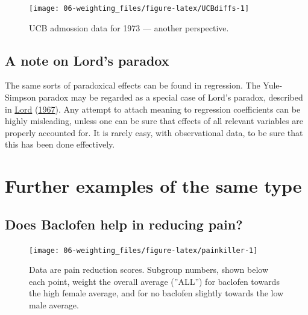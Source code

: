 \documentclass[
  10pt,
  b5paper]{book}
\begin{document}
\begin{figure}[H]

{\centering \texttt{[image: 06-weighting\_files/figure-latex/UCBdiffs-1]} 

}

\caption{UCB admossion data for 1973 --- another perspective.}\label{fig:UCBdiffs}
\end{figure}

\hypertarget{a-note-on-lords-paradox}{%
\subsection*{A note on Lord's paradox}\label{a-note-on-lords-paradox}}

The same sorts of paradoxical effects can be found in regression.
The Yule-Simpson paradox may be regarded as a special case of Lord's
paradox, described in \protect\hyperlink{ref-lord1967paradox}{Lord} (\protect\hyperlink{ref-lord1967paradox}{1967}). Any attempt to attach meaning
to regression coefficients can be highly misleading, unless one can be
sure that effects of all relevant variables are properly
accounted for. It is rarely easy, with observational data, to be sure
that this has been done effectively.

\hypertarget{further-examples-of-the-same-type}{%
\section{Further examples of the same type}\label{further-examples-of-the-same-type}}

\hypertarget{does-baclofen-help-in-reducing-pain}{%
\subsection*{Does Baclofen help in reducing pain?}\label{does-baclofen-help-in-reducing-pain}}

\begin{figure}

{\centering \texttt{[image: 06-weighting\_files/figure-latex/painkiller-1]} 

}

\caption{Data are pain reduction scores. Subgroup numbers, shown
    below each point, weight the overall average (''ALL'') for
    baclofen towards the high female average, and for no baclofen
    slightly towards the low male average.}\label{fig:painkiller}
\end{figure}
\end{document}
